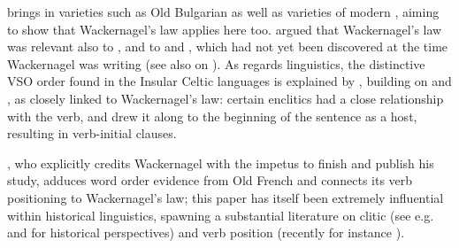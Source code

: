 \documentclass[output=paper]{../langscibook}
\begin{document}
\citet{Nilsson1904} brings in  varieties such as Old Bulgarian as well as varieties of modern , aiming to show that Wackernagel's law applies here too. 
\citet{Ivanov1958} argued that Wackernagel's law was relevant also to , and to  and , which had not yet been discovered at the time Wackernagel was writing (see also \citealp{Carruba1969,Hoffner1973,Garrett1990,Luraghi1998} on ). As regards  linguistics, the distinctive VSO order found in the Insular Celtic languages is explained by \citet{Watkins1963}, building on \citet{Vendryes1912} and \citet{Dillon1947}, as closely linked to Wackernagel's law: certain enclitics had a close relationship with the verb, and drew it along to the beginning of the sentence as a host, resulting in verb-initial clauses.

\citet{Thurneysen1892}, who explicitly credits Wackernagel with the impetus to finish and publish his study, adduces word order evidence from Old French and connects its verb positioning to Wackernagel's law; this paper has itself been extremely influential within historical  linguistics, spawning a substantial literature on clitic  (see e.g. \citealp{Wanner1987} and \citealp{Fontana1993} for historical perspectives) and verb position (recently for instance \citealp{Kaiser2002,Wolfe2018}). 
\end{document}
